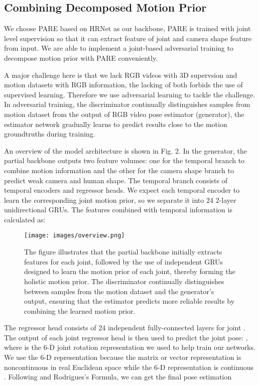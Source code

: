 \documentclass{svproc}
\begin{document}
\subsection{Combining Decomposed Motion Prior}
We choose PARE based on HRNet \cite{wang2020deep} as our backbone, PARE is trained with joint level supervision so that it can extract feature  of joint  and camera shape feature  from input. We are able to implement a joint-based adversarial training to decompose motion prior with PARE conveniently.

A major challenge here is that we lack RGB videos with 3D supervsion and motion datasets with RGB information, the lacking of both forbids the use of supervised learning. Therefore we use adversarial learning to tackle the challenge. In adversarial training, the discriminator continually distinguishes samples from motion dataset from the output of RGB video pose estimator (generator), the estimator network gradually learns to predict results close to the motion groundtruths during training.

An overview of the model architecture is shown in Fig. 2. In the generator, the partial backbone outputs two feature volumes: one for the temporal branch to combine motion information and the other for the camera shape branch to predict weak camera and human shape. The temporal branch consists of temporal encoders and regressor heads. We expect each temporal encoder to learn the corresponding joint motion prior, so we separate it into 24 2-layer unidirectional GRUs. The features combined with temporal information is calculated as:


\begin{figure*}[t]
    \centering
    \texttt{[image: images/overview.png]}
    \caption{The figure illustrates that the partial backbone initially extracts features for each joint, followed by the use of independent GRUs designed to learn the motion prior of each joint, thereby forming the holistic motion prior. The discriminator continually distinguishes between samples from the motion dataset and the generator's output, ensuring that the estimator predicts more reliable results by combining the learned motion prior.}
    \label{fig:figure2}
\end{figure*}

The regressor head consists of 24 independent fully-connected layers  for joint . The output of each joint regressor head is then used to predict the joint pose: , where  is the 6-D joint rotation representation we used to help train our networks. We use the 6-D representation because the matrix or vector representation is  noncontinuous in real Euclidean space while the 6-D representation is continuous \cite{zhou2019continuity}. Following \cite{zhou2019continuity} and Rodrigues's Formula, we can get the final pose estimation
\end{document}
